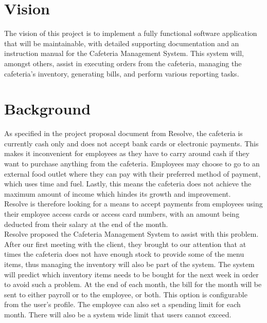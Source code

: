 \documentclass[a4paper,12pt]{article}
\begin{document}
\section{Vision}
The vision of this project is to implement a fully functional software application that will be maintainable, with detailed supporting documentation and an instruction manual for the Cafeteria Management System. This system will, amongst others, assist in executing orders from the cafeteria, managing the cafeteria's inventory, generating bills, and perform various reporting tasks. 

\section{Background}
As specified in the project proposal document from Resolve, the cafeteria is currently cash only and does not accept bank cards or electronic payments. This makes it inconvenient for employees as they have to carry around cash if they want to purchase anything from the cafeteria. Employees may choose to go to an external food outlet where they can pay with their preferred method of payment, which uses time and fuel. Lastly, this means the cafeteria does not achieve the maximum amount of income which hindes its growth and improvement.\\

Resolve is therefore looking for a means to accept payments from employees  using their employee access cards or access card numbers, with an amount being deducted from their salary at the end of the month.\\

Resolve proposed the Cafeteria Management System to assist with this problem.
After our first meeting with the client, they brought to our attention that at times the cafeteria does not have enough stock to provide some of the menu items, thus managing the inventory will also be part of the system. The system will predict which inventory items needs to be bought for the next week in order to avoid such a problem. At the end of each month, the bill for the month will be sent to either payroll or to the employee, or both. This option is configurable from the user's profile. The employee can also set a spending limit for each month. There will also be a system wide limit that users cannot exceed.
\end{document}
